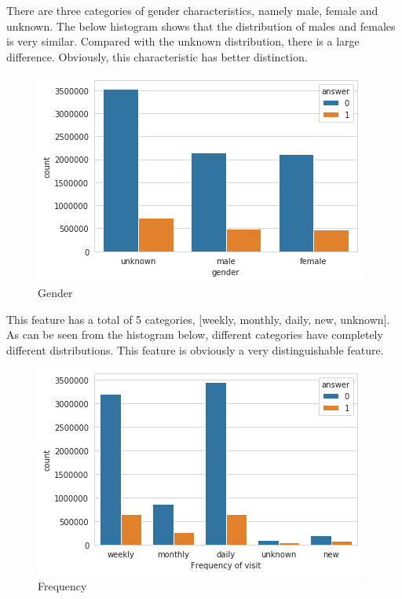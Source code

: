 \documentclass[sigconf]{acmart}
\begin{document}
There are three categories of gender characteristics, namely male, female and unknown. The below histogram shows that the distribution of males and females is very similar. Compared with the unknown distribution, there is a large difference. Obviously, this characteristic has better distinction.

\begin{figure}[H]
  \centering
  \includegraphics[width=\linewidth]{1.png}
  \caption{Gender}
\end{figure}

This feature has a total of 5 categories, [weekly, monthly, daily, new, unknown]. As can be seen from the histogram below, different categories have completely different distributions. This feature is obviously a very distinguishable feature.

\begin{figure}[H]
  \centering
  \includegraphics[width=\linewidth]{2.png}
  \caption{Frequency}
\end{figure}
\end{document}
